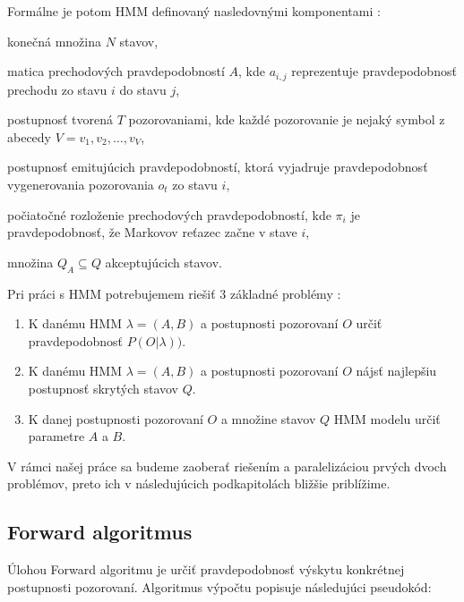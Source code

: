 \documentclass[11pt,a4paper]{article}
\begin{document}
Formálne je potom HMM definovaný nasledovnými komponentami \cite{jurafsky_martin}:
\begin{description}[leftmargin=!,labelwidth=12em]
  \item[$Q = q_1 q_2 \dots q_N$] konečná množina $N$ stavov,
  \item[$A = a_{1,1} a_{1,2} \dots a_{n,1} \dots a_{n,n}$] matica prechodových pravdepodobností $A$, kde $a_{i,j}$ reprezentuje pravdepodobnosť prechodu zo stavu $i$ do stavu $j$,
  \item[$O = o_1 o_2 \dots o_T$] postupnosť tvorená $T$ pozorovaniami, kde každé pozorovanie je nejaký symbol z abecedy $V = v_1, v_2, \dots, v_V$,
  \item[$B = b_i(o_t)$] postupnosť emitujúcich pravdepodobností, ktorá vyjadruje pravdepodobnosť vygenerovania pozorovania $o_t$ zo stavu $i$,
  \item[$\pi = \pi_1, \pi_2, \dots, \pi_N$]  počiatočné rozloženie prechodových pravdepodobností, kde $\pi_i$ je pravdepodobnosť, že Markovov reťazec začne v stave $i$,
  \item[$Q_A = \{q_x, q_y, \dots \}$] množina $Q_A \subseteq Q$ akceptujúcich stavov.
\end{description}

\bigskip

\noindent Pri práci s HMM potrebujemem riešiť 3 základné problémy \cite{rabiner}:
\begin{enumerate}
  \item K danému HMM $\lambda = (A, B)$ a postupnosti pozorovaní $O$ určiť pravdepodobnosť $P(O|\lambda))$.
  \item K danému HMM $\lambda = (A, B)$ a postupnosti pozorovaní $O$ nájsť najlepšiu postupnosť skrytých stavov $Q$.
  \item K danej postupnosti pozorovaní $O$ a množine stavov $Q$ HMM modelu určiť parametre $A$ a $B$.
\end{enumerate}

\noindent V rámci našej práce sa budeme zaoberať riešením a paralelizáciou prvých dvoch problémov, preto ich v následujúcich podkapitolách bližšie priblížime.

\subsection{Forward algoritmus}

Úlohou Forward algoritmu je určiť pravdepodobnosť výskytu konkrétnej postupnosti pozorovaní. Algoritmus výpočtu popisuje následujúci pseudokód:
\end{document}

